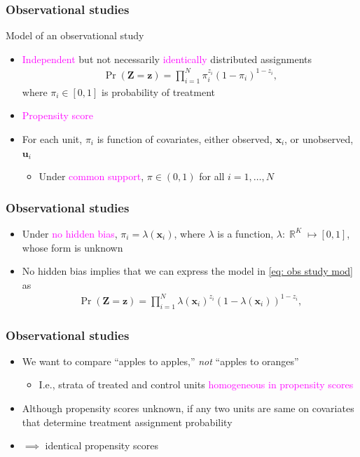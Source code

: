\documentclass[table, xcolor = {dvipsnames}, 9pt]{beamer}
\theoremstyle{plain}
\DeclareMathOperator{\R}{\mathbb{R}}
\begin{document}
\begin{frame}[t]
\frametitle{Observational studies}
\vfill
Model of an observational study \citep{rosenbaum2002a} \vfill
\begin{itemize} \vfill
\item \textcolor{magenta}{Independent} but not necessarily \textcolor{magenta}{identically} distributed assignments \vfill
\begin{align} \label{eq: obs study mod}
\Pr\left(\bm{Z} = \bm{z}\right) = \prod \limits_{i = 1}^N \pi_i^{z_i} (1 - \pi_i)^{1 - z_i},
\end{align}
where $\pi_i \in [0, 1]$ is probability of treatment \vfill
\item \textcolor{magenta}{Propensity score} \vfill
\item For each unit, $\pi_i$ is function of covariates, either observed, $\bm{x}_i$, or unobserved, $\bm{u}_i$ \vfill
\begin{itemize} \vfill
\item Under \textcolor{magenta}{common support}, $\pi \in (0, 1)$ for all $i = 1, \ldots , N$ \vfill
\end{itemize} \vfill
\end{itemize} \vfill
\end{frame}
\begin{frame}[t]
\frametitle{Observational studies}
\vfill
\begin{itemize} \vfill
\item Under \textcolor{magenta}{no hidden bias}, $\pi_i = \lambda(\bm{x}_i)$, where $\lambda$ is a function, $\lambda: \R^K \mapsto [0, 1]$, whose form is unknown \vfill
\item No hidden bias implies that we can express the model in \eqref{eq: obs study mod} as \vfill
\begin{align*}
\Pr\left(\bm{Z} = \bm{z}\right) = \prod \limits_{i = 1}^N \lambda(\bm{x}_i)^{z_i} (1 - \lambda(\bm{x}_i))^{1 - z_i},
\end{align*} \vfill
\end{itemize} \vfill
\end{frame}
\begin{frame}[t]
\frametitle{Observational studies}
\vfill
\begin{itemize} \vfill
\item We want to compare ``apples to apples,'' \textit{not} ``apples to oranges'' \\ \citep{rubinwaterman2006} \vfill
\begin{itemize} \vfill
\item I.e., strata of treated and control units \textcolor{magenta}{homogeneous in propensity scores} \vfill
\end{itemize} \vfill
\item Although propensity scores unknown, if any two units are same on covariates that determine treatment assignment probability \vfill
\item[] $\implies$ identical propensity scores \vfill
\end{itemize} \vfill
\end{frame}
\end{document}
